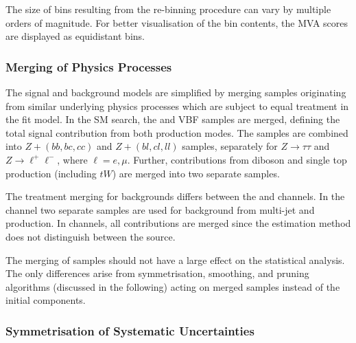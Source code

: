 The size of bins resulting from the re-binning procedure can vary by
multiple orders of magnitude. For better visualisation of the bin
contents, the MVA scores are displayed as equidistant bins.




\subsubsection{Merging of Physics Processes}

The signal and background models are simplified by merging samples
originating from similar underlying physics processes which are
subject to equal treatment in the fit model. In the SM \HH search, the
\ggF and VBF samples are merged, defining the total signal contribution
from both production modes. The \Zjets samples are combined into
$Z + (bb,bc,cc)$ and $Z + (bl,cl,ll)$ samples, separately for
$Z \to \tau\tau$ and $Z \to \ell^+\ell^-$, where $\ell = e,
\mu$. Further, contributions from diboson and single top production
(including $tW$) are merged into two separate samples.

The treatment merging for \faketauhadvis backgrounds differs between
the \hadhad and \lephad channels. In the \hadhad channel two separate
samples are used for \tauhadvis background from multi-jet and \ttbar
production. In \lephad channels, all \faketauhadvis contributions are
merged since the estimation method does not distinguish between the
\faketauhadvis source.

The merging of samples should not have a large effect on the
statistical analysis. The only differences arise from symmetrisation,
smoothing, and pruning algorithms (discussed in the following) acting
on merged samples instead of the initial components.


\subsubsection{Symmetrisation of Systematic Uncertainties}


